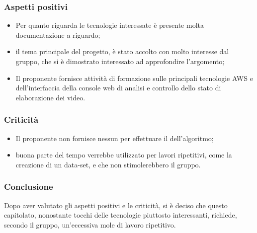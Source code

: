     \subsubsection{Aspetti positivi}
    \begin{itemize}
    		\item Per quanto riguarda le tecnologie interessate è presente molta documentazione a riguardo;
    		\item il tema principale del progetto, è stato accolto con molto interesse dal gruppo, che si è dimostrato interessato ad approfondire l'argomento;
    		 \item Il proponente fornisce attività di formazione sulle principali tecnologie AWS e  dell'interfaccia della console web di analisi e controllo dello stato di elaborazione dei video.
    \end{itemize}
    \subsubsection{Criticità}
    \begin{itemize}
    		\item Il proponente non fornisce nessun  per effettuare il  dell'algoritmo;
    		\item buona parte del tempo verrebbe utilizzato per lavori ripetitivi, come la creazione di un data-set, e che non stimolerebbero il gruppo.
    \end{itemize}

    \subsubsection{Conclusione}
	Dopo aver valutato gli aspetti positivi e le criticità, si è deciso che questo capitolato, nonostante tocchi delle tecnologie piuttosto interessanti, richiede, secondo il gruppo, un'eccessiva mole di lavoro ripetitivo.
